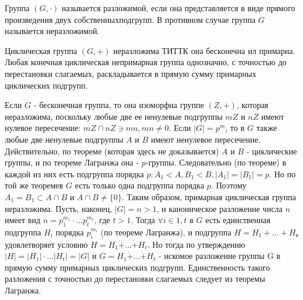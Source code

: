 \begin{defs}[Разложимость]
  Группа $(G, \cdot)$ называется разложимой, если она представляется в виде прямого произведения двух собственныхподгрупп.
  В противном случае группа $G$ называется неразложимой.
\end{defs}

\begin{proofs}
	Циклическая группа $(G, +)$ неразложима ТИТТК она бесконечна ил примарна. Любая конечная
  циклическая непримарная группа однозначно, с точностью до перестановки слагаемых, раскладывается в прямую сумму примарных
  циклических подгрупп.
	\begin{dokvo}
    Если $G$ - бесконечная группа, то она изоморфна группе $(Z, +)$, которая неразложима, поскольку
    любые две ее ненулевые подгруппы $mZ$ и $nZ$ имеют нулевое пересечение: $mZ \cap nZ \ni mn, mn \neq 0$.
    Если $|G| = p^m$, то в $G$ также любые две ненулевые подгруппы $A$ и $B$ имеют ненулевое пересечение.
    Действительно, по теореме (которая здесь не доказывается) $A$ и $B$ - циклические группы, и по теореме Лагранжа
    она - $p$-группы. Следовательно (по теореме) в каждой из них есть подгруппа порядка $p: A_1 < A, B_1 < B,
    |A_1| = |B_1| = p$. Но по той же теоремев $G$ есть только одна подгруппа порядка $p$. Поэтому $A_1 = B_1 \subset A \cap B$ и
    $A \cap B \neq \{0\}$. Таким образом, примарная циклическая группа неразложима.
    Пусть, наконец, $|G| = n > 1$, и каноническое разложение числа $n$ имеет вид $n = p_1^{m_1} \cdot \ldots p_t^{m_t}$, где
    $t > 1$. Тогда $\forall i \in \overline{1,t}$ в $G$ есть единственная подгруппа $H_i$ порядка $p_i^{m_i}$ (по теореме Лагранжа),
    и подгруппа $H = H_1 + \ldots + H_е$ удовлетворяет условию $H = H_1 \dot{+} \ldots \dot{+} H_t$. Но тогда по утверждению
    $|H| = |H_1| \cdot \ldots |H_t| = |G|$ и $G = H_1 \dot{+} \ldots \dot{+} H_t$ - искомое разложение группы G в прямую сумму примарных циклических подгрупп.
    Единственность такого разложения с точностью до перестановки слагаемых следует из теоремы Лагранжа.

	\end{dokvo}
\end{proofs}
